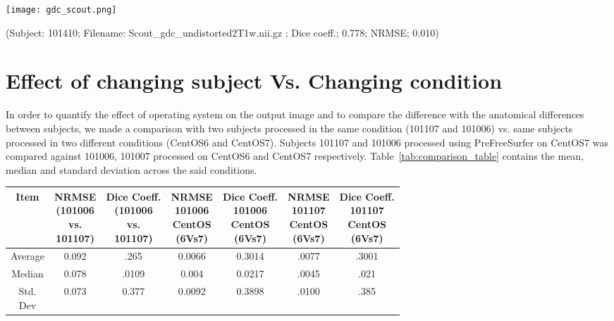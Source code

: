 \begin{center}
\texttt{[image: gdc\_scout.png]}
\caption*{(Subject: 101410; Filename: Scout\_gdc\_undistorted2T1w.nii.gz ; Dice coeff.; 0.778; NRMSE; 0.010)}
\label{fig:scout_gdc_file}
\end{center}

\section{Effect of changing subject Vs. Changing condition}\label{sec:comparison}
In order to quantify the effect of operating system on the output image and to compare the difference with the anatomical differences between subjects, we made a comparison with two subjects processed in the same condition (101107 and 101006) vs. same subjects processed in two different conditions (CentOS6 and CentOS7). Subjects 101107 and 101006 processed using PreFreeSurfer on CentOS7 was compared against 101006, 101007 processed on CentOS6 and CentOS7 respectively. Table~\ref{tab:comparison_table} contains the mean, median and standard deviation across the said conditions.

\begin{center}
\begin{tabularx}{.98\textwidth}{|c|c|c|c|c|c|c|}
\hline
Item  & \makecell[l]{NRMSE\\(101006 \\ vs.\\101107)} & \makecell[l]{Dice Coeff.\\(101006\\ vs.\\101107)} & \makecell[l]{NRMSE\\101006\\CentOS\\(6Vs7)} & \makecell[l]{Dice Coeff.\\ 101006\\CentOS\\(6Vs7)} & \makecell[l]{NRMSE\\101107\\CentOS\\(6Vs7)} & \makecell[l]{Dice Coeff.\\ 101107\\CentOS\\(6Vs7)} \\ \hline
Average            & 0.092        & .265      & 0.0066     & 0.3014   & .0077   & .3001     \\ \hline
Median             & 0.078    & .0109       & 0.004          & 0.0217           & .0045     & .021  \\ \hline
\makecell[l]{Std.\\Dev} & 0.073     & 0.377           & 0.0092         & 0.3898   & .0100       & .385 \\ \hline
\end{tabularx}
\label{tab:comparison_table}
\end{center}

